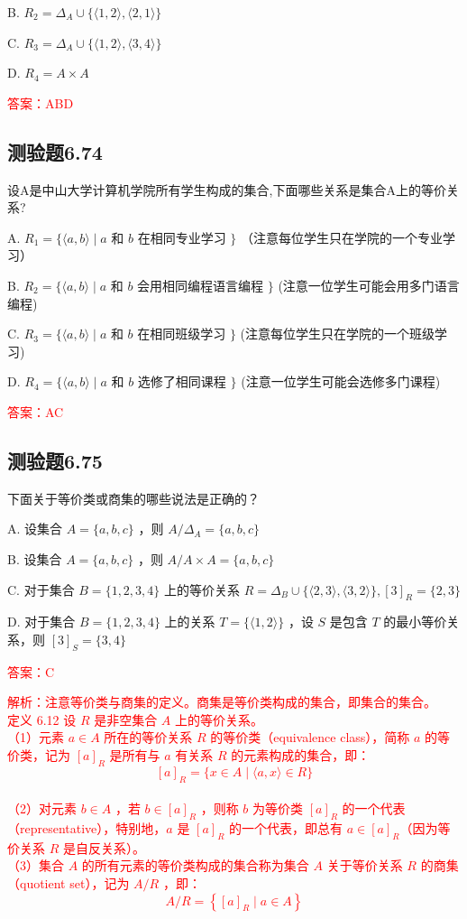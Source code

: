 \documentclass[UTF8, heading=true]{ctexart}
\begin{document}
B. $R_2=\Delta_A \cup\{\langle 1,2\rangle,\langle 2,1\rangle\}$

C. 
$R_3=\Delta_A \cup\{\langle 1,2\rangle,\langle 3,4\rangle\}$

D. $R_4=A \times A$

\textcolor{red}{答案：ABD}



\subsection{测验题6.74}

设A是中山大学计算机学院所有学生构成的集合,下面哪些关系是集合A上的等价关系?

A. $R_1=\{\langle a, b\rangle \mid a$ 和 $b$ 在相同专业学习 $\}$ （注意每位学生只在学院的一个专业学习）

B. $R_2=\{\langle a, b\rangle \mid a$ 和 $b$ 会用相同编程语言编程 $\}$ (注意一位学生可能会用多门语言编程)

C. $R_3=\{\langle a, b\rangle \mid a$ 和 $b$ 在相同班级学习 $\}$ (注意每位学生只在学院的一个班级学习)

D. $R_4=\{\langle a, b\rangle \mid a$ 和 $b$ 选修了相同课程 $\}$ (注意一位学生可能会选修多门课程)

\textcolor{red}{答案：AC}

\subsection{测验题6.75}

下面关于等价类或商集的哪些说法是正确的？

A. 设集合 $A=\{a, b, c\}$ ，则 $A / \Delta_A=\{a, b, c\}$

B. 设集合 $A=\{a, b, c\}$ ，则 $A / A \times A=\{a, b, c\}$

C. 对于集合 $B=\{1,2,3,4\}$ 上的等价关系 $R=\Delta_B \cup\{\langle 2,3\rangle,\langle 3,2\rangle\},[3]_R=\{2,3\}$

D. 对于集合 $B=\{1,2,3,4\}$ 上的关系 $T=\{\langle 1,2\rangle\}$ ，设 $S$ 是包含 $T$ 的最小等价关系，则 $[3]_S=\{3,4\}$

\textcolor{red}{答案：C}

\textcolor{red}{解析：注意等价类与商集的定义。商集是等价类构成的集合，即集合的集合。\\ \indent
定义 6.12 设 $R$ 是非空集合 $A$ 上的等价关系。\\ \indent
（1）元素 $a \in A$ 所在的等价关系 $R$ 的等价类（equivalence class），简称 $a$ 的等价类，记为 $[a]_R$ 是所有与 $a$ 有关系 $R$ 的元素构成的集合，即：
$$
[a]_R=\{x \in A \mid\langle a, x\rangle \in R\}
$$
\\ \indent（2）对元素 $b \in A$ ，若 $b \in[a]_R$ ，则称 $b$ 为等价类 $[a]_R$ 的一个代表（representative），特别地，$a$ 是 $[a]_R$ 的一个代表，即总有 $a \in[a]_R$（因为等价关系 $R$ 是自反关系）。
\\ \indent（3）集合 $A$ 的所有元素的等价类构成的集合称为集合 $A$ 关于等价关系 $R$ 的商集（quotient set），记为 $A / R$ ，即：
$$
A / R=\left\{[a]_R \mid a \in A\right\}
$$
}
\end{document}
